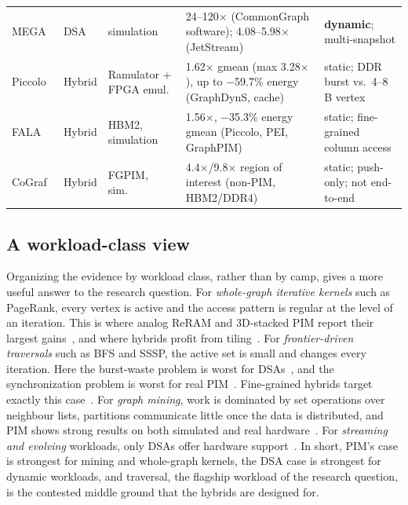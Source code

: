 \documentclass[journal,onecolumn]{IEEEtran}
\begin{document}
\begin{table}[t]
\begin{tabularx}{\textwidth}{@{}L{1.9cm}L{0.9cm}L{3.0cm}YL{3.3cm}@{}}
MEGA~\cite{gao2023mega} & DSA & simulation & 24--120$\times$ (CommonGraph software); 4.08--5.98$\times$ (JetStream) & \textbf{dynamic}; multi-snapshot \\
Piccolo~\cite{shin2025piccolo} & Hybrid & Ramulator + FPGA emul.\ & 1.62$\times$ gmean (max 3.28$\times$), up to $-$59.7\% energy (GraphDynS, cache) & static; DDR burst vs.\ 4--8\,B vertex \\
FALA~\cite{shin2025fala} & Hybrid & HBM2, simulation & 1.56$\times$, $-$35.3\% energy gmean (Piccolo, PEI, GraphPIM) & static; fine-grained column access \\
CoGraf~\cite{yenimol2026cograf} & Hybrid & FGPIM, sim.\ & 4.4$\times$/9.8$\times$ region of interest (non-PIM, HBM2/DDR4) & static; push-only; not end-to-end \\
\bottomrule
\end{tabularx}
\end{table}

\subsection{A workload-class view}
Organizing the evidence by workload class, rather than by camp, gives a more useful answer to the research question. For \emph{whole-graph iterative kernels} such as PageRank, every vertex is active and the access pattern is regular at the level of an iteration. This is where analog ReRAM and 3D-stacked PIM report their largest gains~\cite{song2018graphr,challapalle2020gaasx,ahn2015tesseract}, and where hybrids profit from tiling~\cite{shin2025piccolo}. For \emph{frontier-driven traversals} such as BFS and SSSP, the active set is small and changes every iteration. Here the burst-waste problem is worst for DSAs~\cite{shin2025piccolo}, and the synchronization problem is worst for real PIM~\cite{gomezluna2022prim,barkhordar2025alphapim}. Fine-grained hybrids target exactly this case~\cite{shin2025fala,yenimol2026cograf}. For \emph{graph mining}, work is dominated by set operations over neighbour lists, partitions communicate little once the data is distributed, and PIM shows strong results on both simulated and real hardware~\cite{besta2021sisa,talati2022ndminer,cai2024pimpam}. For \emph{streaming and evolving} workloads, only DSAs offer hardware support~\cite{rahman2021jetstream,zhao2022tdgraph,gao2023mega}. In short, PIM's case is strongest for mining and whole-graph kernels, the DSA case is strongest for dynamic workloads, and traversal, the flagship workload of the research question, is the contested middle ground that the hybrids are designed for.
\end{document}
